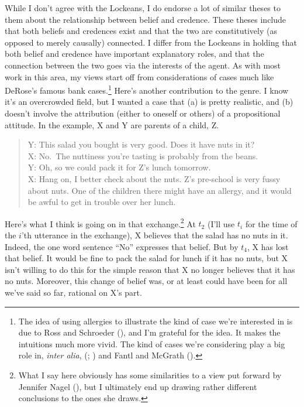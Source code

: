 \documentclass[
  10pt,
  letterpaper,
  DIV=11,
  numbers=noendperiod,
  twoside]{scrartcl}
\begin{document}
While I don't agree with the Lockeans, I do endorse a lot of similar
theses to them about the relationship between belief and credence. These
theses include that both beliefs and credences exist and that the two
are constitutively (as opposed to merely causally) connected. I differ
from the Lockeans in holding that both belief and credence have
important explanatory roles, and that the connection between the two
goes via the interests of the agent. As with most work in this area, my
views start off from considerations of cases much like DeRose's famous
bank cases.\footnote{The idea of using allergies to illustrate the kind
  of case we're interested in is due to Ross and Schroeder
  (), and I'm grateful for the
  idea. It makes the intuitions much more vivid. The kind of cases we're
  considering play a big role in, \emph{inter alia},
  (;
  ) and Fantl and McGrath
  ().} Here's another contribution to the
genre. I know it's an overcrowded field, but I wanted a case that (a) is
pretty realistic, and (b) doesn't involve the attribution (either to
oneself or others) of a propositional attitude. In the example, X and Y
are parents of a child, Z.

\begin{quote}
Y: This salad you bought is very good. Does it have nuts in it?\\
X: No.~The nuttiness you're tasting is probably from the beans.\\
Y: Oh, so we could pack it for Z's lunch tomorrow.\\
X: Hang on, I better check about the nuts. Z's pre-school is very fussy
about nuts. One of the children there might have an allergy, and it
would be awful to get in trouble over her lunch.
\end{quote}

Here's what I think is going on in that exchange.\footnote{What I say
  here obviously has some similarities to a view put forward by Jennifer
  Nagel (), but I ultimately end up
  drawing rather different conclusions to the ones she draws.} At
\(t_2\) (I'll use \(t_i\) for the time of the \(i\)'th utterance in the
exchange), X believes that the salad has no nuts in it. Indeed, the one
word sentence ``No'' expresses that belief. But by \(t_4\), X has lost
that belief. It would be fine to pack the salad for lunch if it has no
nuts, but X isn't willing to do this for the simple reason that X no
longer believes that it has no nuts. Moreover, this change of belief
was, or at least could have been for all we've said so far, rational on
X's part.
\end{document}
